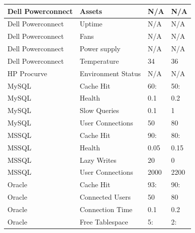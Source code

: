 \begin{table}
\begin{center}
\begin{tabular}{| l | l | l | l |}
	Dell Powerconnect	& Assets			& N/A	& N/A \\ \hline
	Dell Powerconnect	& Uptime			& N/A	& N/A \\ \hline
	Dell Powerconnect	& Fans				& N/A	& N/A \\ \hline
	Dell Powerconnect	& Power supply			& N/A	& N/A \\ \hline
	Dell Powerconnect	& Temperature			& 34	& 36 \\ \hline
	HP Procurve		& Environment Status		& N/A	& N/A \\ \hline
	MySQL			& Cache Hit			& 60: 	& 50: \\ \hline
	MySQL			& Health			& 0.1	& 0.2 \\ \hline
	MySQL			& Slow Queries			& 0.1	& 1 \\ \hline 
	MySQL			& User Connections		& 50	& 80 \\ \hline
	MSSQL			& Cache Hit			& 90:	& 80: \\ \hline
	MSSQL			& Health			& 0.05	& 0.15 \\ \hline
	MSSQL			& Lazy Writes			& 20	& 0 \\ \hline
	MSSQL			& User Connections		& 2000	& 2200 \\ \hline
	Oracle			& Cache Hit			& 93:	& 90: \\ \hline
	Oracle			& Connected Users		& 50	& 80 \\ \hline
	Oracle			& Connection Time		& 0.1	& 0.2 \\ \hline
	Oracle			& Free Tablespace		& 5:	& 2: \\ \hline
\end{tabular}
\label{objekt_varsling}
\end{center}
\end{table}
